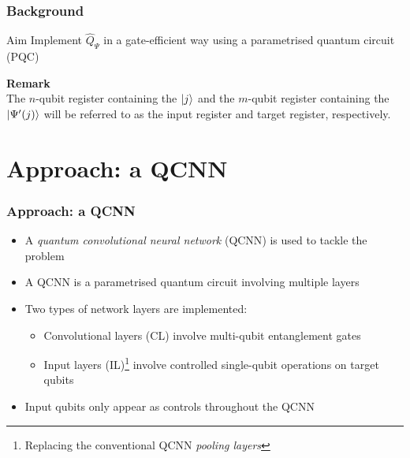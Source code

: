 \documentclass{beamer}
\begin{document}
\begin{frame}
\frametitle{Background}
\begin{alertblock}{Aim}
Implement $\hat{Q}_\Psi$ in a gate-efficient way using a parametrised quantum circuit (PQC)
\end{alertblock}
\vspace{1cm}
\textbf{Remark} \\
The $n$-qubit register containing the $\ket{j}$ and the $m$-qubit register containing the $\ket{\Psi'(j)}$ will be referred to as the \alert{input register} and \alert{target register}, respectively. 
\end{frame}

\section{Approach: a QCNN}
\begin{frame}
\frametitle{Approach: a QCNN}
\begin{itemize}
\item A \emph{quantum convolutional neural network} (\alert{QCNN}) is used to tackle the problem
\item A QCNN is a parametrised quantum circuit involving multiple \alert{layers}
\item Two types of network layers are implemented:
\begin{itemize}
\item \alert{Convolutional layers (CL)} involve multi-qubit entanglement gates 
\item \alert{Input layers (IL)}\footnote{Replacing the conventional QCNN \emph{pooling layers}} involve controlled single-qubit operations on target qubits 
\end{itemize}
\item Input qubits only appear as controls throughout the QCNN
\end{itemize}
\end{frame}
 
\end{document}
